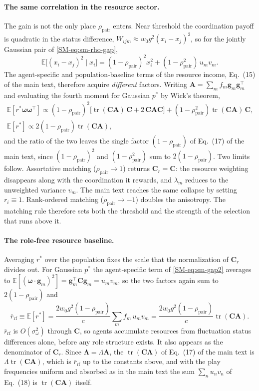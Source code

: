 \documentclass[
  aps,prx,
  preprint,
  superscriptaddress,
  nofootinbib
]{revtex4-2}
\newcommand{\w}{\bm{\omega}}
\newcommand{\g}{\mathbf{g}}
\newcommand{\C}{\mathbf{C}}
\newcommand{\rrf}{\bar r_{\mathrm{rf}}}
\newcommand{\Cr}{\mathbf{C}_r}
\newcommand{\Lam}{\bm{\Lambda}}
\newcommand{\rhopair}{\rho_{\mathrm{pair}}}
\newcommand{\sidn}{\sigma_{\omega}}
\newcommand{\gain}{g}
\begin{document}
\paragraph{The same correlation in the resource sector.} The gain is not the only place $\rhopair$ enters. Near threshold the coordination payoff is quadratic in the status difference, $W_{ijm}\approx w_0\gain^2(x_i-x_j)^2$, so for the jointly Gaussian pair of \cref{SM-eq:sm-rho-gap},
\begin{equation}\label{SM-eq:sm-gap2}
\mathbb E\bigl[(x_i-x_j)^2\mid x_i\bigr]=(1-\rhopair)^2x_i^2+(1-\rhopair^2)\,u_mv_m .
\end{equation}
The agent-specific and population-baseline terms of the resource income, Eq.~(15) of the main text, therefore acquire \emph{different} factors. Writing $\bm A=\sum_m f_m\g_m\g_m^{\!\top}$ and evaluating the fourth moment for Gaussian $p^*$ by Wick's theorem,
\begin{equation}\label{SM-eq:sm-Cr-rho}
\begin{gathered}
\mathbb E[r^*\w\w^{\!\top}]\propto(1-\rhopair)^2\bigl[\operatorname{tr}(\C\bm A)\,\C+2\,\C\bm A\C\bigr]+(1-\rhopair^2)\operatorname{tr}(\C\bm A)\,\C,\\[2pt]
\mathbb E[r^*]\propto2(1-\rhopair)\operatorname{tr}(\C\bm A),
\end{gathered}
\end{equation}
and the ratio of the two leaves the single factor $(1-\rhopair)$ of Eq.~(17) of the main text, since $(1-\rhopair)^2$ and $(1-\rhopair^2)$ sum to $2(1-\rhopair)$. Two limits follow. Assortative matching ($\rhopair\to1$) returns $\Cr=\C$: the resource weighting disappears along with the coordination it rewards, and $\lambda_m$ reduces to the unweighted variance $v_m$. The main text reaches the same collapse by setting $r_i\equiv1$. Rank-ordered matching ($\rhopair\to-1$) doubles the anisotropy. The matching rule therefore sets both the threshold and the strength of the selection that runs above it.

\paragraph{The role-free resource baseline.} Averaging $r^*$ over the population fixes the scale that the normalization of $\Cr$ divides out. For Gaussian $p^*$ the agent-specific term of \cref{SM-eq:sm-gap2} averages to $\mathbb E[(\w\cdot\g_m)^2]=\g_m^{\!\top}\C\g_m=u_mv_m$, so the two factors again sum to $2(1-\rhopair)$ and
\begin{equation*}
\rrf\equiv\mathbb E[r^*]=\frac{2w_0\gain^2(1-\rhopair)}{c}\sum_m f_m\,u_mv_m=\frac{2w_0\gain^2(1-\rhopair)}{c}\operatorname{tr}(\C\bm A).
\end{equation*}
$\rrf$ is $O(\sidn^2)$ through $\C$, so agents accumulate resources from fluctuation status differences alone, before any role structure exists. It also appears as the denominator of $\Cr$. Since $\Lam=\Lambda\bm A$, the $\operatorname{tr}(\C\Lam)$ of Eq.~(17) of the main text is $\Lambda\operatorname{tr}(\C\bm A)$, which is $\rrf$ up to the constants above, and with the play frequencies uniform and absorbed as in the main text the sum $\sum_nu_nv_n$ of Eq.~(18) is $\operatorname{tr}(\C\bm A)$ itself.
\end{document}
